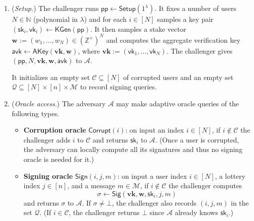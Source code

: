 \documentclass{article}
\newcommand{\sk}[0]{\mathsf{sk}}
\newcommand{\vk}[0]{\mathsf{vk}}
\begin{document}
\begin{enumerate}
  \item (\emph{Setup.})
        The challenger runs
        $\mathsf{pp} \leftarrow \mathsf{Setup}(1^\lambda)$.
        It fixes a number of users $N \in \mathbb{N}$ (polynomial in $\lambda$)
        and for each $i \in [N]$ samples a key pair
        $(\sk_i,\vk_i) \leftarrow \mathsf{KGen}(\mathsf{pp})$.
        It then samples a stake vector
        $\mathbf{w} := (w_1,\dots,w_N) \in (\mathbb{Z}^+)^N$
        and computes the aggregate verification key
        $\mathsf{avk} \leftarrow \mathsf{AKey}(\mathbf{vk},\mathbf{w})$,
        where $\mathbf{vk} := (\vk_1,\dots,\vk_N)$.
        The challenger gives
        $(\mathsf{pp}, N, \mathbf{vk}, \mathbf{w}, \mathsf{avk})$
        to $\mathcal{A}$.

        It initializes an empty set $\mathcal{C} \subseteq [N]$ of corrupted
        users and an empty set
        $\mathcal{Q} \subseteq [N] \times [n] \times \mathcal{M}$ to record
        signing queries.

  \item (\emph{Oracle access.})
        The adversary $\mathcal{A}$ may make adaptive oracle queries of the
        following types.

        \begin{itemize}
          \item \textbf{Corruption oracle} $\mathsf{Corrupt}(i)$:
                on input an index $i \in [N]$,
                if $i \notin \mathcal{C}$ the challenger adds $i$ to
                $\mathcal{C}$ and returns $\sk_i$ to $\mathcal{A}$.
                (Once a user is corrupted, the adversary can locally compute
                all its signatures and thus no signing oracle is needed for it.)

          \item \textbf{Signing oracle} $\mathsf{Sign}(i,j,m)$:
                on input a user index $i \in [N]$, a lottery index $j \in [n]$,
                and a message $m \in \mathcal{M}$, if $i \notin \mathcal{C}$
                the challenger computes
                \[
                  \sigma \leftarrow
                  \mathsf{Sig}(\mathbf{vk}, \mathbf{w}, \sk_i, j, m)
                \]
                and returns $\sigma$ to $\mathcal{A}$.
                If $\sigma \neq \bot$, the challenger also records
                $(i,j,m)$ in the set $\mathcal{Q}$.
                (If $i \in \mathcal{C}$, the challenger returns $\bot$ since
                $\mathcal{A}$ already knows $\sk_i$.)
        \end{itemize}


\end{enumerate}
\end{document}
